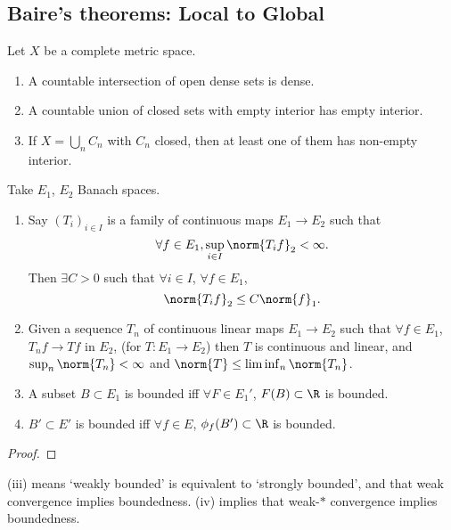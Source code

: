 \documentclass[twoside]{article}
\begin{document}
\subsection{Baire's theorems: Local to Global}
\begin{lemma}[Baire]
    Let $X$ be a complete metric space.
    \begin{enumerate}[label=(\roman*)]
        \item A countable intersection of open dense sets is dense.
        \item A countable union of closed sets with empty interior has empty interior.
        \item If $X = \bigcup_n C_n$ with $C_n$ closed, then at least one of them has non-empty interior.
    \end{enumerate}
\end{lemma}
\begin{thm}
    Take $E_1$, $E_2$ Banach spaces.
    \begin{enumerate}[label=(\roman*)]
        \item Say $(T_i)_{i \in I}$ is a family of continuous maps $E_1 \to E_2$ such that
            \begin{equation*}
                \forall f \in E_1, \sup_{i \in I} \norm{T_i f}_2 < \infty.
            \end{equation*}
            Then $\exists C > 0$ such that $\forall i \in I$, $\forall f \in E_1$,
            \begin{equation*}
                \norm{T_i f}_2 \leq C \norm{f}_1.
            \end{equation*}
        \item Given a sequence $T_n$ of continuous linear maps $E_1 \to E_2$ such that $\forall f \in E_1$, $T_n f \to Tf$ in $E_2$, (for $T: E_1 \to E_2$) then $T$ is continuous and linear, and $\sup_n \norm{T_n} < \infty$ and $\norm{T} \leq \liminf_n \norm{T_n}$.
        \item A subset $B \subset E_1$ is bounded iff $\forall F \in E_1'$, $F(B) \subset \R$ is bounded.
        \item $B' \subset E'$ is bounded iff $\forall f \in E$, $\phi_f(B') \subset \R$ is bounded.
    \end{enumerate}
\end{thm}
\begin{proof}
\end{proof}
\begin{remark}
    (iii) means `weakly bounded' is equivalent to `strongly bounded', and that weak convergence implies boundedness. (iv) implies that weak-$*$ convergence implies boundedness.
\end{remark}
\end{document}
